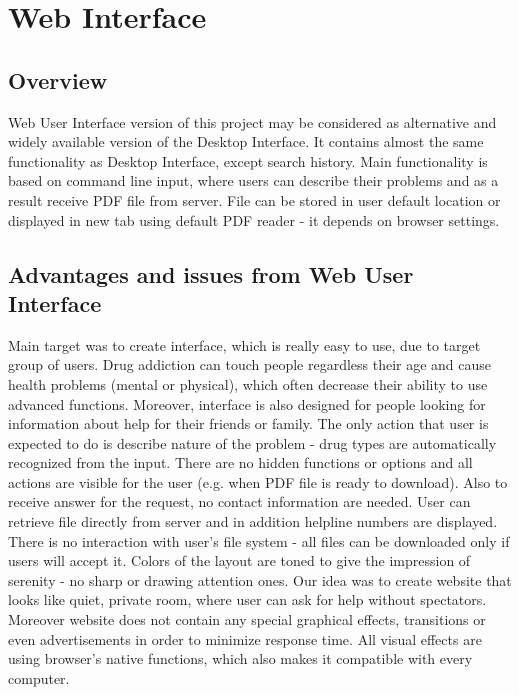 \documentclass[a4paper,12pt, twocolumn]{article}
\begin{document}

\section*{Web Interface}

\subsection*{Overview}
Web User Interface version of this project may be considered as alternative and widely available version of the Desktop Interface. It contains almost the same functionality as Desktop Interface, except search history. Main functionality is based on command line input, where users can describe their problems and as a result receive PDF ﬁle from server. File can be stored in user default location or displayed in new tab using default PDF reader - it depends on browser settings.

\subsection*{Advantages and issues from Web User Interface}
Main target was to create interface, which is really easy to use, due to target group of users. Drug addiction can touch people regardless their age and cause health problems (mental or physical), which often decrease their ability to use advanced functions. Moreover, interface is also designed for people looking for information about help for their friends or family. The only action that user is expected to do is describe nature of the problem - drug types are automatically recognized from the input. There are no hidden functions or options and all actions are visible for the user (e.g. when PDF file is ready to download). Also to receive answer for the request, no contact information are needed. User can retrieve file directly from server and in addition helpline numbers are displayed. There is no interaction with user's file system - all files can be downloaded only if users will accept it. 
Colors of the layout are toned to give the impression of serenity - no sharp or drawing attention ones. Our idea was to create website that looks like quiet, private room, where user can ask for help without spectators. Moreover website does not contain any special graphical effects, transitions or even advertisements in order to minimize response time. All visual effects are using browser's native functions, which also makes it compatible with every computer.
\end{document}
